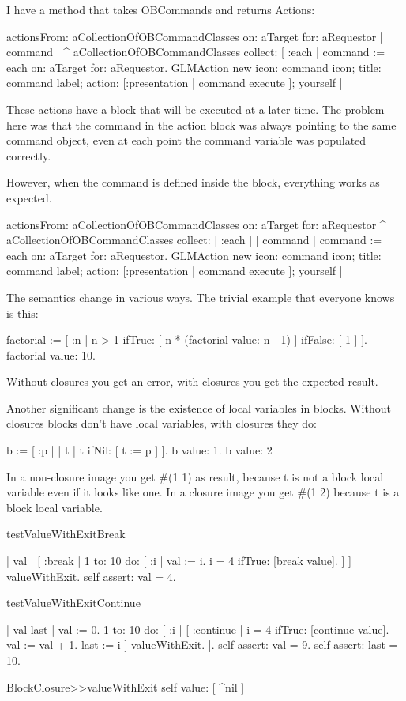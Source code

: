 \documentclass[a4paper,10pt,twoside]{book}
\begin{document}
I have a method that takes OBCommands and returns Actions:

\begin{code}{}
actionsFrom: aCollectionOfOBCommandClasses on: aTarget for: aRequestor
	| command |
	^ aCollectionOfOBCommandClasses collect: [ :each |
		command := each on: aTarget for: aRequestor.
		GLMAction new
			icon: command icon;
			title: command label;
			action: [:presentation | command execute ];
			yourself
		]
	\end{code}

These actions have a block that will be executed at a later time. The  
problem here was that the command in the action block was always  
pointing to the same command object, even at each point the command  
variable was populated correctly.

However, when the command is defined inside the block, everything  
works as expected.

\begin{code}{}
actionsFrom: aCollectionOfOBCommandClasses on: aTarget for: aRequestor
	^ aCollectionOfOBCommandClasses collect: [ :each |
		| command |
		command := each on: aTarget for: aRequestor.
		GLMAction new
			icon: command icon;
			title: command label;
			action: [:presentation | command execute ];
			yourself
		]
	\end{code}




The semantics change in various ways. The trivial example that everyone 
knows is this:
\begin{code}{}
factorial := [ :n |
	n > 1
		ifTrue: [ n * (factorial value: n - 1) ]
		ifFalse: [ 1 ] ].
factorial value: 10.
\end{code}
Without closures you get an error, with closures you get the expected 
result.

Another significant change is the existence of local variables in blocks. 
Without closures blocks don't have local variables, with closures they do:

\begin{code}{}
b := [ :p |
	| t |
	t ifNil: [ t := p ] ].
{ b value: 1. b value: 2 }
\end{code}

In a non-closure image you get \#(1 1) as result, because t is not a block 
local variable even if it looks like one. In a closure image you get \#(1 2)
because t is a block local variable.


\begin{code}{}
testValueWithExitBreak

	| val |	
	[ :break |
	    1 to: 10 do: [ :i |
			val := i.
			i = 4 ifTrue: [break value].
		] 
	] valueWithExit.
	self assert: val = 4.



testValueWithExitContinue

	| val last |	
	val := 0. 
	1 to: 10 do: [ :i |
		[ :continue |
			i = 4 ifTrue: [continue value].
			val := val + 1.
			last := i
		] valueWithExit.
	].
	self assert: val = 9.
	self assert: last = 10.	

BlockClosure>>valueWithExit 
	  self value: [ ^nil ]
\end{code}

\ifx\wholebook\relax\else
   
   
\end{document}
